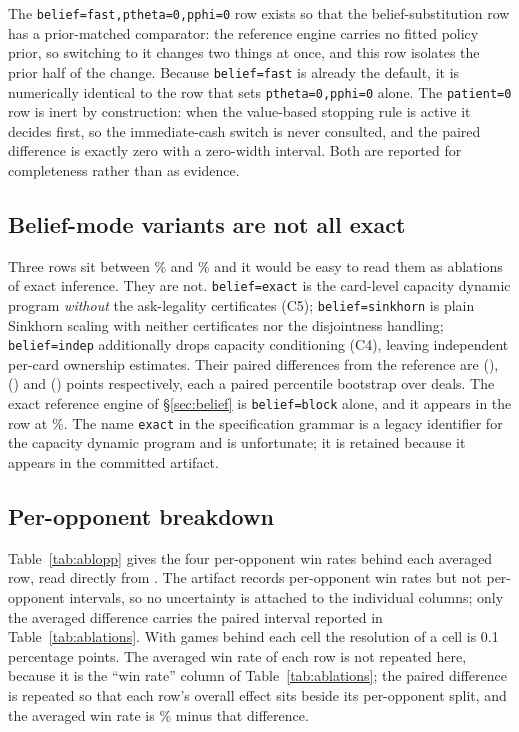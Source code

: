 The \texttt{belief=fast,ptheta=0,pphi=0} row exists so that the belief-substitution
row has a prior-matched comparator: the reference engine carries no fitted
policy prior, so switching to it changes two things at once, and this row
isolates the prior half of the change. Because \texttt{belief=fast} is already
the default, it is numerically identical to the row that sets
\texttt{ptheta=0,pphi=0} alone. The \texttt{patient=0} row is inert by
construction: when the
value-based stopping rule is active it decides first, so the immediate-cash
switch is never consulted, and the paired difference is exactly zero with a
zero-width interval. Both are reported for completeness rather than as
evidence.

\subsection{Belief-mode variants are not all exact}
\label{app:abl-beliefmodes}

Three rows sit between \numAblCFourAbs\% and \numAblCFiveAbs\% and it would be
easy to read them as ablations of exact inference. They are not.
\texttt{belief=exact} is the card-level capacity
dynamic program \emph{without} the ask-legality certificates (C5);
\texttt{belief=sinkhorn} is plain Sinkhorn scaling with neither certificates nor
the disjointness handling; \texttt{belief=indep} additionally drops capacity
conditioning (C4), leaving independent per-card ownership estimates. Their
paired differences from the reference are \numAblCFive{}
(\numAblCFiveCI{}), \numAblSinkhorn{} (\numAblSinkhornCI{}) and \numAblCFour{}
(\numAblCFourCI{}) points respectively, each a paired percentile bootstrap over
deals. The exact
reference engine of \S\ref{sec:belief} is \texttt{belief=block} alone, and it
appears in the row at \numAblBlockAbs\%. The name \texttt{exact} in the specification
grammar is a legacy identifier for the capacity dynamic program and is
unfortunate; it is retained because it appears in the committed artifact.

\subsection{Per-opponent breakdown}
\label{app:abl-peropponent}

Table~\ref{tab:ablopp} gives the four per-opponent win rates behind each
averaged row, read directly from
. The artifact records
per-opponent win rates but not per-opponent intervals, so no uncertainty is
attached to the individual columns; only the averaged difference carries the
paired interval reported in Table~\ref{tab:ablations}. With \numAblGames{}
games behind each cell the resolution of a cell is 0.1 percentage points. The
averaged win rate of each row is not repeated here, because it is the ``win
rate'' column of Table~\ref{tab:ablations}; the paired difference is repeated so
that each row's overall effect sits beside its per-opponent split, and the
averaged win rate is \numAblRef\% minus that difference.

